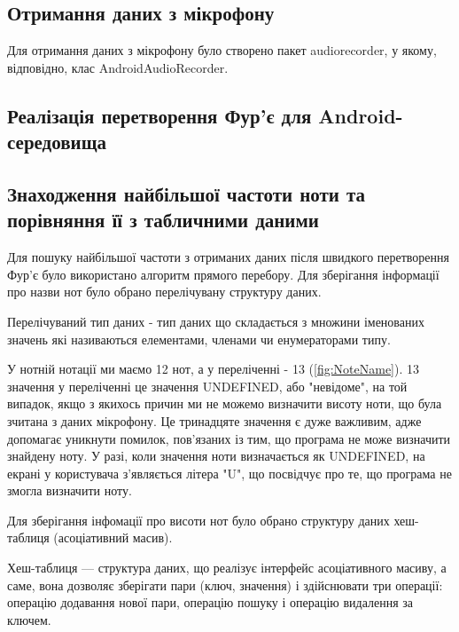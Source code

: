 \subsection{Отримання даних з мікрофону}

Для отримання даних з мікрофону було створено пакет audiorecorder, у якому, відповідно, клас AndroidAudioRecorder.

\subsection{Реалізація перетворення Фур'є для Android-середовища}


\subsection{Знаходження найбільшої частоти ноти та порівняння її з табличними даними}

Для пошуку найбільшої частоти з отриманих даних після швидкого перетворення Фур'є було використано алгоритм прямого перебору. Для зберігання інформації про назви нот було обрано перелічувану структуру даних.

Перелічуваний тип даних - тип даних що складається з множини іменованих значень які називаються елементами, членами чи енумераторами типу.

У нотній нотації ми маємо 12 нот, а у переліченні - 13 (\ref{fig:NoteName}). 13 значення у переліченні це значення UNDEFINED, або "невідоме", на той випадок, якщо з якихось причин ми не можемо визначити висоту ноти, що була зчитана з даних мікрофону. 
Це тринадцяте значення є дуже важливим, адже допомагає уникнути помилок, пов'язаних із тим, що програма не може визначити знайдену ноту. У разі, коли значення ноти визначається як UNDEFINED, на екрані у користувача з'являється літера "U", що посвідчує про те, що програма не змогла визначити ноту.

Для зберігання інфомації про висоти нот було обрано структуру даних хеш-таблиця 
(асоціативний масив).

Хеш-таблиця — структура даних, що реалізує інтерфейс асоціативного масиву, а саме, вона дозволяє зберігати пари (ключ, значення) і здійснювати три операції: операцію додавання нової пари, операцію пошуку і операцію видалення за ключем.

